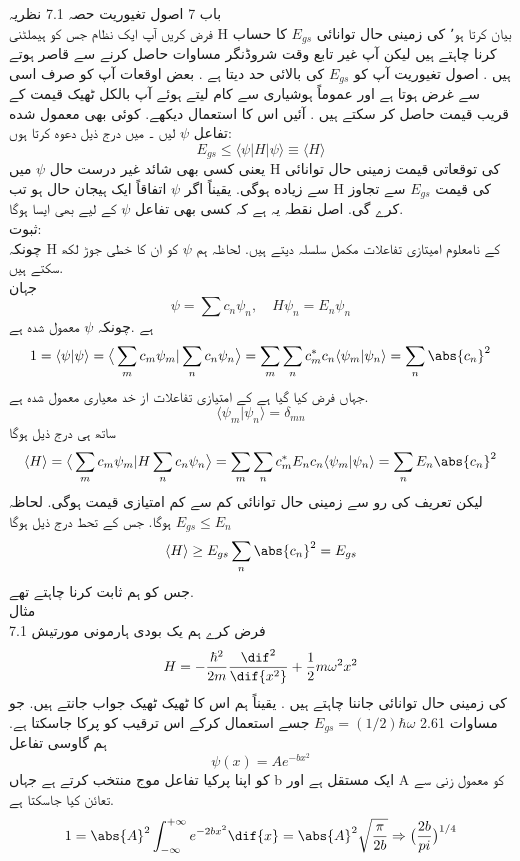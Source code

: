 
باب 7 اصول تغيوریت حصہ 7.1 نظریہ\\
فرض کریں آپ ایک نظام جس کو ہیملٹنی H بیان کرتا ہو٬ کی زمینی حال توانائی
 \(E_{gs}\)
   کا حساب کرنا چاہتے ہیں لیکن آپ غير تابع وقت شروڈنگر مساوات حاصل کرنے سے قاصر ہوتے ہیں . اصول تغيوریت آپ کو 
  \(E_{gs}\)
   کی بالائی حد دیتا ہے . بعض اوقعات آپ کو صرف اسی سے غرض ہوتا ہے اور عموماً ہوشیاری سے کام لیتے ہوئے آپ بالکل ٹھیک قیمت کے قريب قیمت حاصل کر سکتے ہیں . آئیں اس کا استعمال دیکھے. کوئی بھی معمول شده تفاعل 
\(\psi\)
    لیں ۔ میں درج ذيل دعوه کرتا ہوں:
\[E_{gs}\le \langle \psi |H|\psi\rangle \equiv \langle H \rangle\]
یعنی کسی بھی شائد غير درست حال 
\(\psi\)
 میں H کی توقعاتی قیمت زمینی حال توانائی سے زياده ہوگی. یقیناً اگر 
 \(\psi\) 
 اتفاقاً ایک ہیجان حال ہو تب H کی قیمت
  \(E_{gs}\) 
 سے تجاوز کرے گی. اصل نقطہ یہ ہے کہ کسی بھی تفاعل 
 \(\psi\)
  کے لیے بھی ایسا ہوگا.\\
ثبوت: \\
چونکہ H کے نامعلوم امیتازی تفاعلات مكمل سلسلہ دیتے ہیں. لحاظہ ہم 
\(\psi\) 
کو ان کا خطی جوڑ لکھ سکتے ہیں.\\
جہان
\[\psi=\sum c_{n}\psi_{n}, \quad H\psi_{n}=E_{n}\psi_{n}\] 
ہے .چونکہ 
\(\psi\) 
معمول شده ہے\\
\[1=\langle \psi |\psi\rangle=\big\langle \sum_{m} c_{m}\psi_{m}|\sum_{n}c_{n}\psi_{n}\big\rangle=\sum_{m}\sum_{n}c_{m}^{*}c_{n}\langle \psi_{m}|\psi_{n}\rangle=\sum_{n}\abs{c_{n}}^{2}\]
جہاں فرض کیا گیا ہے کے امتیازی تفاعلات از خد معیاری معمول شدہ ہے.
\[\langle \psi_{m}|\psi_{n}\rangle=\delta_{mn}\]
ساتھ ہی درج ذیل ہوگا
\[\langle H \rangle=\big\langle \sum_{m} c_{m}\psi_{m}|H\sum_{n}c_{n}\psi_{n}\big\rangle=\sum_{m}\sum_{n}c_{m}^{*}E_{n}c_{n}\langle \psi_{m}|\psi_{n}\rangle=\sum_{n}E_{n}\abs{c_{n}}^{2}\]
ليكن تعريف کی رو سے زمینی حال توانائی کم سے کم  امتیازی قیمت ہوگی. لحاظہ
\(E_{gs}\le E_{n}\)
ہوگا. جس کے تحط درج ذیل ہوگا
\[\langle H \rangle \ge E_{gs}\sum_{n}\abs{c_{n}}^{2}=E_{gs}\]
جس کو ہم ثابت کرنا چاہتے تھے.\\
مثال \\7.1
فرض كرے ہم یک بودی ہارمونی مورتیش
\[H=-\frac{\hbar^{2}}{2m}\frac{\dif^{2}}{\dif{x^{2}}}+\frac{1}{2}m\omega^{2}x^{2}\]
کی زمینی حال توانائی جاننا چاہتے ہیں . یقیناً ہم اس کا ٹھیک ٹھیک جواب جانتے ہیں. جو مساوات 2.61
\(E_{gs}=(1/2)\hbar\omega\)
جسے استعمال کرکے اس ترقيب کو پرکا جاسکتا ہے. ہم گاوسی تفاعل
 \[\psi(x)=Ae^{-bx^{2}}\] 
کو اپنا پرکیا تفاعل موج منتخب کرتے ہے جہاں b ایک مستقل ہے اور A کو معمول زنی سے تعائن کیا جاسکتا ہے.
\[1=\abs{A}^{2}\int_{-\infty}^{+\infty}e^{-2bx^{2}}\dif{x}=\abs{A}^{2}\sqrt{\frac{\pi}{2b}}\Rightarrow \big (\frac{2b}{pi}\big )^{1/4}\]
